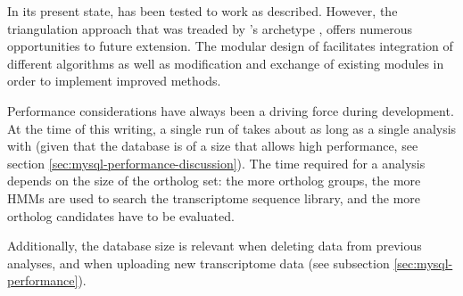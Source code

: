 In its present state, \pname has been tested to work as described. However, the
triangulation approach that was treaded by \pname's archetype \hamstr, offers
numerous opportunities to future extension. The modular design of \pname
facilitates integration of different algorithms as well as modification and
exchange of existing modules in order to implement improved methods.

Performance considerations have always been a driving force during development.
At the time of this writing, a single run of \pname takes about as long as a
single analysis with \hamstr (given that the database is of a size that allows
high performance, see section \ref{sec:mysql-performance-discussion}). The time
required for a \pname analysis depends on the size of the ortholog set: the more
ortholog groups, the more HMMs are used to search the transcriptome sequence
library, and the more ortholog candidates have to be evaluated.

Additionally, the database size is relevant when deleting data from previous
analyses, and when uploading new transcriptome data (see subsection
\ref{sec:mysql-performance}). 
